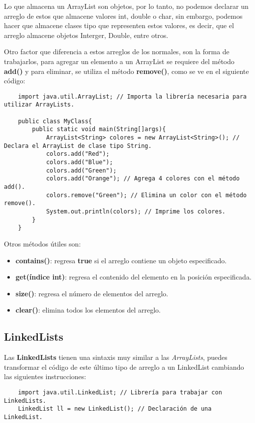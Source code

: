 Lo que almacena un ArrayList son objetos, por lo tanto, no podemos declarar un arreglo de estos que almacene valores int, double o char, sin embargo, podemos hacer que almacene clases tipo que representen estos valores, es decir, que el arreglo almacene objetos Interger, Double, entre otros.

Otro factor que diferencia a estos arreglos de los normales, son la forma de trabajarlos, para agregar un elemento a un ArrayList se requiere del método \textbf{add()} y para eliminar, se utiliza el método \textbf{remove()}, como se ve en el siguiente código:
\begin{lstlisting}
    import java.util.ArrayList; // Importa la librería necesaria para utilizar ArrayLists.
    
    public class MyClass{
        public static void main(String[]args){
            ArrayList<String> colores = new ArrayList<String>(); // Declara el ArrayList de clase tipo String.
            colors.add("Red");
            colors.add("Blue");
            colors.add("Green");
            colors.add("Orange"); // Agrega 4 colores con el método add().
            colors.remove("Green"); // Elimina un color con el método remove().
            System.out.println(colors); // Imprime los colores.
        }
    }
\end{lstlisting}

Otros métodos útiles son:
\begin{itemize}
    \item \textbf{contains()}: regresa \textbf{true} si el arreglo contiene un objeto especificado.
    \item \textbf{get(índice int)}: regresa el contenido del elemento en la posición especificada. 
    \item \textbf{size()}: regresa el número de elementos del arreglo.
    \item \textbf{clear()}: elimina todos los elementos del arreglo.
\end{itemize}


\subsection{LinkedLists}

Las \textbf{LinkedLists} tienen una sintaxis muy similar a las \textit{ArrayLists}, puedes transformar el código de este último tipo de arreglo a un LinkedList cambiando las siguientes instrucciones:
\begin{lstlisting}
    import java.util.LinkedList; // Librería para trabajar con LinkedLists.
    LinkedList ll = new LinkedList(); // Declaración de una LinkedList.
\end{lstlisting}

